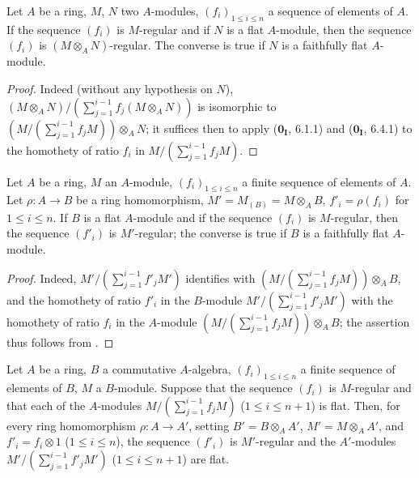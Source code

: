 \begin{proposition}[15.1.13]
\label{0.15.1.13}
Let $A$ be a ring, $M$, $N$ two $A$-modules, $(f_i)_{1\leq i\leq n}$ a sequence of elements of $A$.
If the sequence $(f_i)$ is $M$-regular and if $N$ is a flat $A$-module, then the sequence $(f_i)$ is $(M\otimes_AN)$-regular.
The converse is true if $N$ is a faithfully flat $A$-module.
\end{proposition}

\begin{proof}
Indeed (without any hypothesis on $N$), $(M\otimes_AN)/(\sum_{j=1}^{i-1}f_j(M\otimes_AN))$ is isomorphic to $(M/(\sum_{j=1}^{i-1}f_jM))\otimes_AN$;
it suffices then to apply ($\mathbf{0_I}$, 6.1.1) and ($\mathbf{0_I}$, 6.4.1) to the homothety of ratio $f_i$ in $M/(\sum_{j=1}^{i-1}f_jM)$.
\end{proof}

\begin{corollary}[15.1.14]
\label{0.15.1.14}
Let $A$ be a ring, $M$ an $A$-module, $(f_i)_{1\leq i\leq n}$ a finite sequence of elements of $A$.
Let $\rho:A\to B$ be a ring homomorphism, $M'=M_{(B)}=M\otimes_AB$, $f'_i=\rho(f_i)$ for $1\leq i\leq n$.
If $B$ is a flat $A$-module and if the sequence $(f_i)$ is $M$-regular, then the sequence $(f'_i)$ is $M'$-regular;
the converse is true if $B$ is a faithfully flat $A$-module.
\end{corollary}

\begin{proof}
Indeed, $M'/(\sum_{j=1}^{i-1}f'_jM')$ identifies with $(M/(\sum_{j=1}^{i-1}f_jM))\otimes_AB$, and the homothety of ratio $f'_i$ in the $B$-module $M'/(\sum_{j=1}^{i-1}f'_jM')$ with the homothety of ratio $f_i$ in the $A$-module $(M/(\sum_{j=1}^{i-1}f_jM))\otimes_AB$;
the assertion thus follows from .
\end{proof}

\begin{proposition}[15.1.15]
\label{0.15.1.15}
Let $A$ be a ring, $B$ a commutative $A$-algebra, $(f_i)_{1\leq i\leq n}$ a finite sequence of elements of $B$, $M$ a $B$-module.
Suppose that the sequence $(f_i)$ is $M$-regular and that each of the $A$-modules $M/(\sum_{j=1}^{i-1}f_jM)$ ($1\leq i\leq n+1$) is flat.
Then, for every ring homomorphism $\rho:A\to A'$, setting $B'=B\otimes_AA'$, $M'=M\otimes_AA'$, and $f'_i=f_i\otimes 1$ ($1\leq i\leq n$), the sequence $(f'_i)$ is $M'$-regular and the $A'$-modules $M'/(\sum_{j=1}^{i-1}f'_jM')$ ($1\leq i\leq n+1$) are flat.
\end{proposition}

